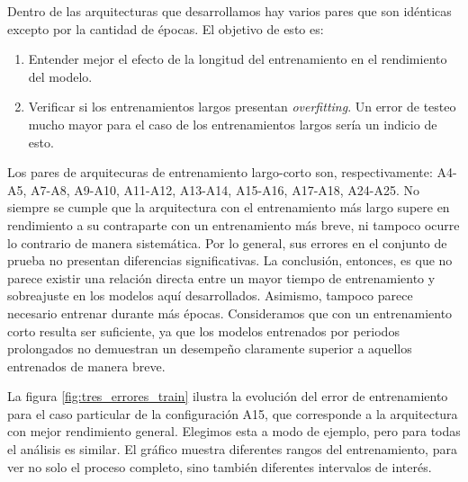 
Dentro de las arquitecturas que desarrollamos hay varios pares que son idénticas excepto por la cantidad de épocas. El objetivo de esto es:
\begin{enumerate}
    \item Entender mejor el efecto de la longitud del entrenamiento en el rendimiento del modelo.
    \item Verificar si los entrenamientos largos presentan \emph{overfitting}. Un error de testeo mucho mayor para el caso de los entrenamientos largos sería un indicio de esto.
\end{enumerate}
Los pares de arquitecuras de entrenamiento largo-corto son, respectivamente: A4-A5, A7-A8, A9-A10, A11-A12, A13-A14, A15-A16, A17-A18, A24-A25. No siempre se cumple que la arquitectura con el entrenamiento más largo supere en rendimiento a su contraparte con un entrenamiento más breve, ni tampoco ocurre lo contrario de manera sistemática. Por lo general, sus errores en el conjunto de prueba no presentan diferencias significativas. La conclusión, entonces, es que no parece existir una relación directa entre un mayor tiempo de entrenamiento y sobreajuste en los modelos aquí desarrollados. Asimismo, tampoco parece necesario entrenar durante más épocas. Consideramos que con un entrenamiento corto resulta ser suficiente, ya que los modelos entrenados por periodos prolongados no demuestran un desempeño claramente superior a aquellos entrenados de manera breve.


La figura \ref{fig:tres_errores_train} ilustra la evolución del error de entrenamiento para el caso particular de la configuración A15, que corresponde a la arquitectura con mejor rendimiento general. Elegimos esta a modo de ejemplo, pero para todas el análisis es similar. El gráfico muestra diferentes rangos del entrenamiento, para ver no solo el proceso completo, sino también diferentes intervalos de interés.

